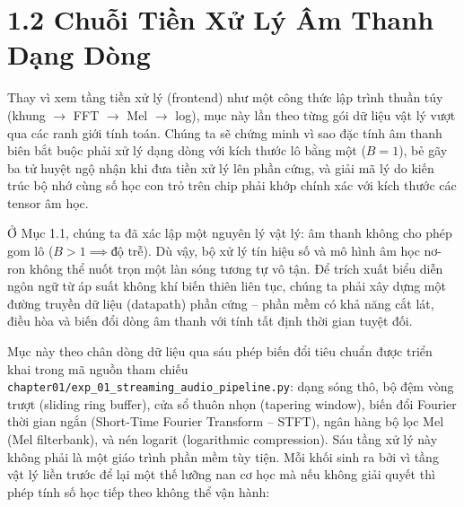 \documentclass[11pt,a4paper]{article}
\begin{document}
\vspace*{-5mm}
\section*{1.2 Chuỗi Tiền Xử Lý Âm Thanh Dạng Dòng}
\vspace{-2mm}

\begin{learningobj}
Thay vì xem tầng tiền xử lý (frontend) như một công thức lập trình thuần túy (khung $\to$ FFT $\to$ Mel $\to$ log), mục này lần theo từng gói dữ liệu vật lý vượt qua các ranh giới tính toán. Chúng ta sẽ chứng minh vì sao đặc tính âm thanh biên bắt buộc phải xử lý dạng dòng với kích thước lô bằng một ($B = 1$), bẻ gãy ba tử huyệt ngộ nhận khi đưa tiền xử lý lên phần cứng, và giải mã lý do kiến trúc bộ nhớ cùng số học con trỏ trên chip phải khớp chính xác với kích thước các tensor âm học.
\end{learningobj}

Ở Mục 1.1, chúng ta đã xác lập một nguyên lý vật lý: âm thanh không cho phép gom lô ($B > 1 \implies \text{độ trễ}$). Dù vậy, bộ xử lý tín hiệu số và mô hình âm học nơ-ron không thể nuốt trọn một làn sóng tương tự vô tận. Để trích xuất biểu diễn ngôn ngữ từ áp suất không khí biến thiên liên tục, chúng ta phải xây dựng một đường truyền dữ liệu (datapath) phần cứng -- phần mềm có khả năng cắt lát, điều hòa và biến đổi dòng âm thanh với tính tất định thời gian tuyệt đối.

Mục này theo chân dòng dữ liệu qua sáu phép biến đổi tiêu chuẩn được triển khai trong mã nguồn tham chiếu \nolinkurl{chapter01/exp_01_streaming_audio_pipeline.py}: dạng sóng thô, bộ đệm vòng trượt (sliding ring buffer), cửa sổ thuôn nhọn (tapering window), biến đổi Fourier thời gian ngắn (Short-Time Fourier Transform -- STFT), ngân hàng bộ lọc Mel (Mel filterbank), và nén logarit (logarithmic compression). Sáu tầng xử lý này không phải là một giáo trình phần mềm tùy tiện. Mỗi khối sinh ra bởi vì tầng vật lý liền trước để lại một thế lưỡng nan cơ học mà nếu không giải quyết thì phép tính số học tiếp theo không thể vận hành:
\end{document}
